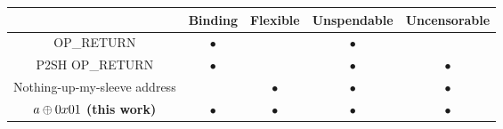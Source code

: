 \begin{center}
    \newcommand{\y}{$\bullet$}
    \newcommand{\n}{}
    \begin{tabular}{ |c|c|c|c|c| }
     \hline
                                        & Binding & Flexible & Unspendable & Uncensorable \\
     \hline
     OP\_RETURN                         & \y      & \n       & \y          & \n \\
     P2SH OP\_RETURN                    & \y      & \n       & \y          & \y \\
     Nothing-up-my-sleeve address       & \n      & \y       & \y          & \y \\
     $a \oplus 0x01$ \textbf{(this work)} & \y      & \y       & \y          & \y \\
     \hline
    \end{tabular}
\end{center}
